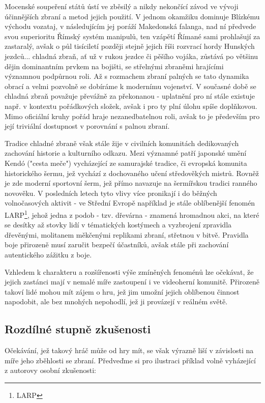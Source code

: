 Mocenské soupeření států ústí ve zběsilý a nikdy nekončící závod ve vývoji účinnějších zbraní a metod jejich použití. V jednom okamžiku dominuje Blízkému východu vozataj, v následujícím jej poráží Makedonská falanga, nad ní předvede svou superioritu Římský systém manipulů, ten vzápětí Římané sami prohlašují za zastaralý, avšak o půl tisíciletí později stejně jejich říši rozvrací hordy Hunských jezdců... chladná zbraň, ať už v rukou jezdce či pěšího vojáka, zůstává po většinu dějin dominantním prvkem na bojišti, se střelnými zbraněmi hrajícími významnou podpůrnou roli. Až s rozmachem zbraní palných se tato dynamika obrací a velmi pozvolně se dobíráme k modernímu vojenství. V současné době se chladná zbraň považuje převážně za překonanou - uplatnění pro ní stále existuje např. v kontextu pořádkových složek, avšak i pro ty plní úlohu spíše doplňkovou. Mimo oficiální kruhy pořád hraje nezanedbatelnou roli, avšak to je především pro její triviální dostupnost v porovnání s palnou zbraní.

Tradice chladné zbraně však stále žije v civilních komunitách dedikovaných zachování historie a kulturního odkazu. Mezi významné patří japonské umění Kendó ("cesta meče") vycházející ze samurajské tradice, či evropská komunita historického šermu, jež vychází z dochovaného učení středověkých mistrů. Rovněž je zde moderní sportovní šerm, jež přímo navazuje na šermířskou tradici ranného novověku. V posledních letech tyto vlivy více pronikají i do běžných volnočasových aktivit - ve Střední Evropě například je stále oblíbenější fenomén LARP\footnote{\ac{LARP}}, jehož jedna z podob - tzv. dřevárna - znamená hromadnou akci, na které se desítky až stovky lidí v tématických kostýmech a vyzbrojení zpravidla dřevěnými, molitanem měkčenými replikami zbraní, střetnou v bitvě. Pravidla boje přirozeně musí zaručit bezpečí účastníků, avšak stále při zachování autentického zážitku z boje.  

Vzhledem k charakteru a rozšířenosti výše zmíněných fenoménů lze očekávat, že jejich zastánci mají v nemalé míře zastoupení i ve videoherní komunitě. Přirozeně takoví lidé mohou mít zájem o hru, jež jim umožní jejich oblíbenou činnost napodobit, ale bez mnohých nepohodlí, jež ji provázejí v reálném světě.

\subsection{Rozdílné stupně zkušenosti}
Očekávání, jež takový hráč může od hry mít, se však výrazně liší v závislosti na míře jeho zběhlosti se zbraní. Předveďme si pro ilustraci příklad volně vyházející z autorovy osobní zkušenosti:

